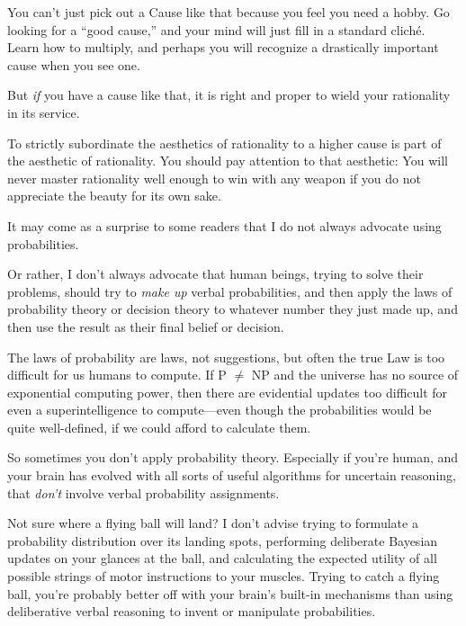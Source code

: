  You can't just pick out a Cause like that because
you feel you need a hobby. Go looking for a ``good
cause,'' and your mind will just fill in a standard
cliché. Learn how to multiply, and perhaps you will recognize a
drastically important cause when you see one.


 But \textit{if} you have a cause like that, it is right and proper
to wield your rationality in its service.


 To strictly subordinate the aesthetics of rationality to a higher
cause is part of the aesthetic of rationality. You should pay attention
to that aesthetic: You will never master rationality well enough to win
with any weapon if you do not appreciate the beauty for its own sake.

\myendsectiontext


\bigskip



 It may come as a surprise to some readers that I do not always
advocate using probabilities. 


 Or rather, I don't always advocate that human
beings, trying to solve their problems, should try to \textit{make up}
verbal probabilities, and then apply the laws of probability theory or
decision theory to whatever number they just made up, and then use the
result as their final belief or decision.


 The laws of probability are laws, not suggestions, but often the
true Law is too difficult for us humans to compute. If \textsf{P} ${\neq}$ \textsf{NP}
and the universe has no source of exponential computing power, then
there are evidential updates too difficult for even a superintelligence
to compute---even though the probabilities would be quite well-defined,
if we could afford to calculate them.


 So sometimes you don't apply probability theory.
Especially if you're human, and your brain has evolved
with all sorts of useful algorithms for uncertain reasoning, that
\textit{don't} involve verbal probability assignments.


 Not sure where a flying ball will land? I don't
advise trying to formulate a probability distribution over its landing
spots, performing deliberate Bayesian updates on your glances at the
ball, and calculating the expected utility of all possible strings of
motor instructions to your muscles. Trying to catch a flying ball,
you're probably better off with your
brain's built-in mechanisms than using deliberative
verbal reasoning to invent or manipulate probabilities.


